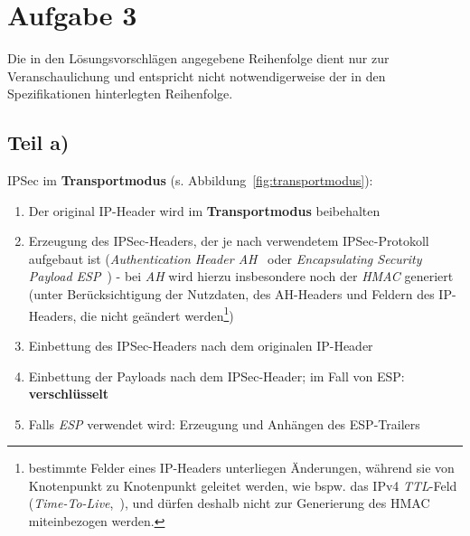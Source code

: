 \chapter{Aufgabe 3}

\noindent
Die in den Lösungsvorschlägen angegebene Reihenfolge dient nur zur Veranschaulichung und entspricht nicht notwendigerweise der in den Spezifikationen hinterlegten Reihenfolge.

\section{Teil a)}
IPSec im \textbf{Transportmodus} (s. Abbildung~\ref{fig:transportmodus}):

\begin{enumerate}
    \itemsep0.5em
    \item Der original IP-Header wird im \textbf{Transportmodus} beibehalten
    \item Erzeugung des IPSec-Headers, der je nach verwendetem IPSec-Protokoll aufgebaut ist (\textit{Authentication Header AH}~\cite{RFC4302} oder \textit{Encapsulating Security Payload ESP}~\cite{RFC4303}) - bei \textit{AH} wird hierzu insbesondere noch der \textit{HMAC} generiert (unter Berücksichtigung der Nutzdaten, des AH-Headers und Feldern des IP-Headers, die nicht geändert werden\footnote{
    bestimmte Felder eines IP-Headers unterliegen Änderungen, während sie von Knotenpunkt zu Knotenpunkt geleitet werden, wie bspw. das IPv4 \textit{TTL}-Feld (\textit{Time-To-Live},~\cite[360 ff.]{KR14}), und dürfen deshalb nicht zur Generierung des HMAC miteinbezogen werden.
    })

    \item Einbettung des IPSec-Headers nach dem originalen IP-Header
    \item Einbettung der Payloads nach dem IPSec-Header; im Fall von ESP: \textbf{verschlüsselt}
    \item Falls \textit{ESP} verwendet wird: Erzeugung und Anhängen des ESP-Trailers
\end{enumerate}

